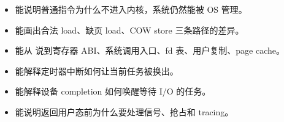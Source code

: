 \begin{rubricbox}
\begin{itemize}
\tightlist
\item 能说明普通指令为什么不进入内核，系统仍然能被 OS 管理。
\item 能画出合法 load、缺页 load、COW store 三条路径的差异。
\item 能从  说到寄存器 ABI、系统调用入口、fd 表、用户复制、page cache。
\item 能解释定时器中断如何让当前任务被换出。
\item 能解释设备 completion 如何唤醒等待 I/O 的任务。
\item 能说明返回用户态前为什么要处理信号、抢占和 tracing。
\end{itemize}
\end{rubricbox}
